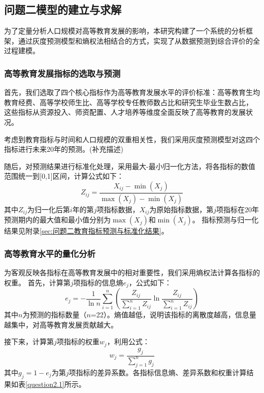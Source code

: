 \documentclass[withoutpreface,bwprint]{cumcmthesis} %
\begin{document}
\subsection{问题二模型的建立与求解}

为了定量分析人口规模对高等教育发展的影响，本研究构建了一个系统的分析框架，通过灰度预测模型和熵权法相结合的方式，实现了从数据预测到综合评价的全过程建模。

\subsubsection{高等教育发展指标的选取与预测}

首先，我们选取了四个核心指标作为高等教育发展水平的评价标准：高等教育生均教育经费、高等学校师生比、高等学校专任教师数占比和研究生毕业生数占比，
这些指标从资源投入、师资配置、人才培养等维度全面反映了高等教育的发展状况。

考虑到教育指标与时间和人口规模的双重相关性，我们采用灰度预测模型对这四个指标进行未来20年的预测。(补充描述)

随后，对预测结果进行标准化处理，采用最大-最小归一化方法，将各指标的数值范围统一到[0,1]区间，计算公式如下：
\begin{equation}
    Z_{i j}=\frac{X_{i j}-\min \left(X_j\right)}{\max \left(X_j\right)-\min \left(X_j\right)}
\end{equation}
其中$Z_{ij}$为归一化后第$i$年的第$j$项指标数据，$X_{ij}$为原始指标数据，第$j$项指标在20年预测期内的最大值和最小值分别为$\max(X_j)$和$\min(X_j)$。
指标预测与归一化结果见附录\ref{sec:问题二教育指标预测与标准化结果}。

\subsubsection{高等教育水平的量化分析}

为客观反映各指标在高等教育发展中的相对重要性，我们采用熵权法计算各指标的权重。
首先，计算第$j$项指标的信息熵$e_j$，公式如下：
\begin{equation}
    e_j=-\frac{1}{\ln n} \sum_{i=1}^n\left(\frac{Z_{i j}}{\sum_{i=1}^n Z_{i j}} \ln \frac{Z_{i j}}{\sum_{i=1}^n Z_{i j}}\right)
\end{equation}
其中$n$为预测的指标数量（$n$=22）。熵值越低，说明该指标的离散度越高，信息量越集中，对高等教育发展贡献越大。

接下来，计算第$j$项指标的权重$w_j$，利用公式：
\begin{equation}
    w_j=\frac{g_j}{\sum_{j=1}^n g_j}
\end{equation}
其中$g_j=1-e_j$为第$j$项指标的差异系数。各指标信息熵、差异系数和权重计算结果如表\ref{question2.1}所示。
\end{document}

